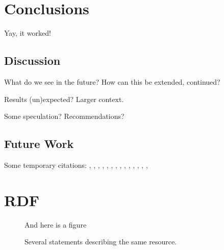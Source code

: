 \documentclass[a4paper,11pt]{kth-mag}
\begin{document}
\pagestyle{newchap}
\chapter{Conclusions}
Yay, it worked!


\section{Discussion}

What do we see in the future? How can this be extended, continued?

Results (un)expected? Larger context.

Some speculation? Recommendations?

\section{Future Work}


Some temporary citations:
\cite{hoare69}, \cite{floyd67}, \cite{pnueli77}, \cite{leucker09abriefaccount},
\cite{bauer06monitoring}, \cite{bauer08goodbadugly}, \cite{delgado04taxonomy},
\cite{meyer92applyingdbc}, \cite{rosenblum95practicalassertions},
\cite{bartetzko01jass}, \cite{bodden04lightweightltl},
\cite{bodden05efficientrv}, \cite{becksmalltalktesting}, \cite{fowlerxunit},
\cite{matusiak09aoppy}












\appendix
\addappheadtotoc
\chapter{RDF}\label{appA}

\begin{figure}[ht]
\begin{center}
And here is a figure
\caption{\small{Several statements describing the same resource.}}\label{RDF_4}
\end{center}
\end{figure}
\end{document}
